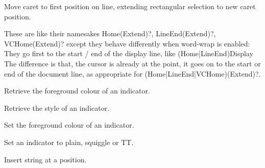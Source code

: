
Move caret to first position on line, extending rectangular selection to new caret position.


\label{wxstyledtextctrlhomewrap}


These are like their namesakes Home(Extend)?, LineEnd(Extend)?, VCHome(Extend)?
except they behave differently when word-wrap is enabled:
They go first to the start / end of the display line, like (Home|LineEnd)Display
The difference is that, the cursor is already at the point, it goes on to the start
or end of the document line, as appropriate for (Home|LineEnd|VCHome)(Extend)?.


\label{wxstyledtextctrlhomewrapextend}



\label{wxstyledtextctrlindicatorgetforeground}


Retrieve the foreground colour of an indicator.


\label{wxstyledtextctrlindicatorgetstyle}


Retrieve the style of an indicator.


\label{wxstyledtextctrlindicatorsetforeground}


Set the foreground colour of an indicator.


\label{wxstyledtextctrlindicatorsetstyle}


Set an indicator to plain, squiggle or TT.


\label{wxstyledtextctrlinserttext}


Insert string at a position.


